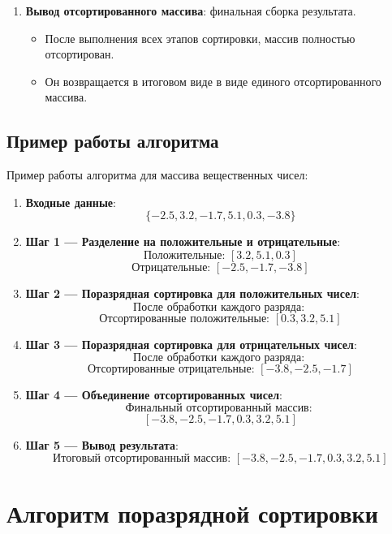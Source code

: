\documentclass[12pt]{article}
\begin{document}
\begin{enumerate}
\item \textbf{Вывод отсортированного массива}: финальная сборка результата.
\begin{itemize}
    \item После выполнения всех этапов сортировки, массив полностью отсортирован.
    \item Он возвращается в итоговом виде в виде единого отсортированного массива.
\end{itemize}

\end{enumerate}
\subsection{Пример работы алгоритма}

\hspace*{1.25em}Пример работы алгоритма для массива вещественных чисел:

\begin{enumerate}
    \item \textbf{Входные данные}: 
    \[
    \{-2.5, 3.2, -1.7, 5.1, 0.3, -3.8\}
    \]

    \item \textbf{Шаг 1 — Разделение на положительные и отрицательные}:
    \[
    \text{Положительные: } [3.2, 5.1, 0.3]
    \]
    \[
    \text{Отрицательные: } [-2.5, -1.7, -3.8]
    \]

    \item \textbf{Шаг 2 — Поразрядная сортировка для положительных чисел}:
    \[
    \text{После обработки каждого разряда: }
    \]
    \[
    \text{Отсортированные положительные: } [0.3, 3.2, 5.1]
    \]

    \item \textbf{Шаг 3 — Поразрядная сортировка для отрицательных чисел}:
    \[
    \text{После обработки каждого разряда: }
    \]
    \[
    \text{Отсортированные отрицательные: } [-3.8, -2.5, -1.7]
    \]

    \item \textbf{Шаг 4 — Объединение отсортированных чисел}:
    \[
    \text{Финальный отсортированный массив: }
    \]
    \[
    [-3.8, -2.5, -1.7, 0.3, 3.2, 5.1]
    \]

    \item \textbf{Шаг 5 — Вывод результата}:
    \[
    \text{Итоговый отсортированный массив: } [-3.8, -2.5, -1.7, 0.3, 3.2, 5.1]
    \]
\end{enumerate}

\section{Алгоритм поразрядной сортировки}
\end{document}
